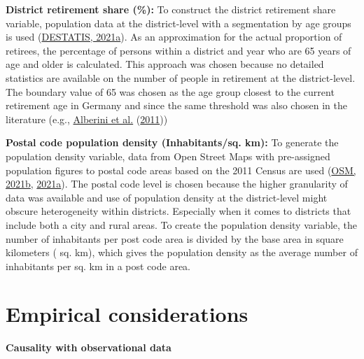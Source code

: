 \documentclass[12pt,twoside]{reedthesis}
\begin{document}
\textbf{District retirement share (\%):} To construct the district retirement share variable, population data at the district-level with a segmentation by age groups is used (\protect\hyperlink{ref-destatis21c}{DESTATIS, 2021a}). As an approximation for the actual proportion of retirees, the percentage of persons within a district and year who are 65 years of age and older is calculated. This approach was chosen because no detailed statistics are available on the number of people in retirement at the district-level. The boundary value of 65 was chosen as the age group closest to the current retirement age in Germany and since the same threshold was also chosen in the literature (e.g., \protect\hyperlink{ref-alberini_etal11}{Alberini et al.} (\protect\hyperlink{ref-alberini_etal11}{2011}))

\textbf{Postal code population density (Inhabitants/sq. km):} To generate the population density variable, data from Open Street Maps with pre-assigned population figures to postal code areas based on the 2011 Census are used (\protect\hyperlink{ref-osm21}{OSM, 2021b}, \protect\hyperlink{ref-osm21a}{2021a}). The postal code level is chosen because the higher granularity of data was available and use of population density at the district-level might obscure heterogeneity within districts. Especially when it comes to districts that include both a city and rural areas. To create the population density variable, the number of inhabitants per post code area is divided by the base area in square kilometers ( sq. km), which gives the population density as the average number of inhabitants per sq. km in a post code area.

\hypertarget{empirical-considerations}{%
\section{Empirical considerations}\label{empirical-considerations}}

\textbf{Causality with observational data}
\end{document}
